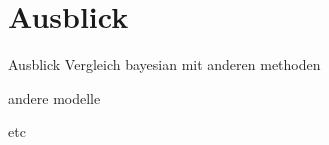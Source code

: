 \section{Ausblick}

\begin{frame}{Ausblick}
    Vergleich bayesian mit anderen methoden

    andere modelle

    etc
    
\end{frame}